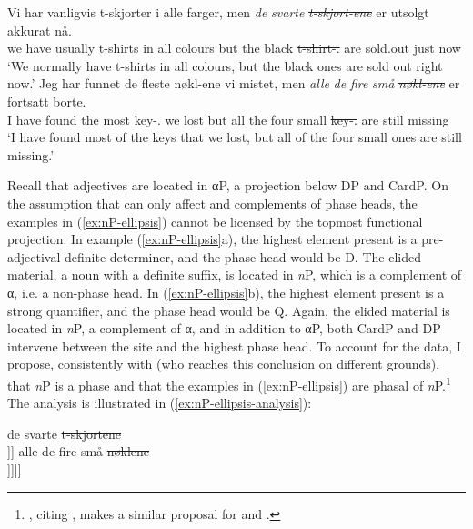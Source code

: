 \documentclass[output=paper]{langsci/langscibook}
\begin{document}
\ea\label{ex:nP-ellipsis} 
    \ea
    \gll Vi har vanligvis t-skjorter i alle farger, men \textit{de}
    \textit{svarte}  \textit{\sout{t-skjort-ene}} er utsolgt akkurat n\aa{}.\\
        we have usually t-shirts in all colours but the black
        \sout{t-shirt-\Pl.\Def{}} are sold.out just now\\
    \glt `We normally have t-shirts in all colours, but the black ones are sold out right now.'
    \ex
    \gll Jeg har funnet de fleste nøkl-ene vi mistet, men \textit{alle}
    \textit{de} \textit{fire} \textit{sm\aa{}} \textit{\sout{nøkl-ene}} er fortsatt borte.\\
    I have found the most key-\Pl.\Def{} we lost but all the four small
    \sout{key-\Pl.\Def{}} are still missing\\
    \glt `I have found most of the keys that we lost, but all of the four
    small ones are still missing.'
    \z
\z

\noindent Recall that adjectives are located in αP, a projection
below DP and CardP. On the assumption that  can only affect  and
complements of phase heads, the examples in (\ref{ex:nP-ellipsis}) cannot be
licensed by the topmost functional projection. In example
(\ref{ex:nP-ellipsis}a), the highest element present is a pre-adjectival
definite determiner, and the phase head would be D. The elided material, a
noun with a definite suffix, is located in \emph{n}P, which is a
complement of α{}, i.e. a non-phase head. In (\ref{ex:nP-ellipsis}b),
the highest element present is a strong quantifier, and the phase head would
be Q. Again, the elided material is  located in \emph{n}P, a complement of
α{}, and in addition to  αP, both CardP and DP intervene
between the  site and the highest phase head. To account for the data,
I propose, consistently with \citet{julien2005nominal} (who reaches this
conclusion on different grounds), that \emph{n}P is a phase and that the
examples in (\ref{ex:nP-ellipsis}) are phasal  of
\emph{n}P.\footnote{\citet{simpson2017parallels}, citing
    \citet{ruda2016NPellipsis}, makes a similar proposal for  and
.} The analysis is illustrated in (\ref{ex:nP-ellipsis-analysis}):\largerpage[-3]

\ea\label{ex:nP-ellipsis-analysis}
		\ea
		de svarte \sout{t-skjortene}\\\relax
	[\tss{DP} [\tss{αP} [\tss{\sout{\emph{n}P}...} ]]]
	\ex
	alle de fire små \sout{nøklene}\\\relax
		[\tss{QP} [\tss{DP} [\tss{CardP} [\tss{αP} [\tss{\sout{\emph{n}P}...} ]]]]]
		\z
\z
\end{document}
